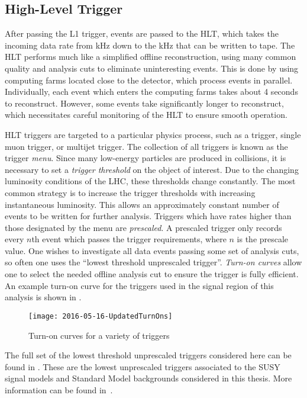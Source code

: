 \subsection{High-Level Trigger}

After passing the L1 trigger, events are passed to the HLT, which takes the incoming data rate from  kHz down to the  kHz that can be written to tape.
The HLT performs much like a simplified offline reconstruction, using many common quality and analysis cuts to eliminate uninteresting events.
This is done by using computing farms located close to the detector, which process events in parallel.
Individually, each event which enters the computing farms takes about 4 seconds to reconstruct.
However, some events take significantly longer to reconstruct, which necessitates careful monitoring of the HLT to ensure smooth operation.

HLT triggers are targeted to a particular physics process, such as a \met trigger, single muon trigger, or multijet trigger.
The collection of all triggers is known as the trigger \textit{menu}.
Since many low-energy particles are produced in collisions, it is necessary to set a \textit{trigger threshold} on the object of interest.
Due to the changing luminosity conditions of the LHC, these thresholds change constantly.
The most common strategy is to increase the trigger thresholds with increasing instantaneous luminosity.
This allows an approximately constant number of events to be written for further analysis.
Triggers which have rates higher than those designated by the menu are \textit{prescaled}.
A prescaled trigger only records every $n$th event which passes the trigger requirements, where $n$ is the prescale value.
One wishes to investigate all data events passing some set of analysis cuts, so often one uses the ``lowest threshold unprescaled trigger''.
\textit{Turn-on curves} allow one to select the needed offline analysis cut to ensure the trigger is fully efficient.
An example turn-on curve for the \met triggers used in the signal region of this analysis is shown in .
\begin{figure}[tbp]
\caption{Turn-on curves for a variety of \met triggers} \label{fig:met_turnon}
\texttt{[image: 2016-05-16-UpdatedTurnOns]}
\end{figure}

The full set of the lowest threshold unprescaled triggers considered here can be found in .
These are the lowest unprescaled triggers associated to the SUSY signal models and Standard Model backgrounds considered in this thesis.
More information can be found in~\cite{ATL-DAQ-PUB-2016-001}.

